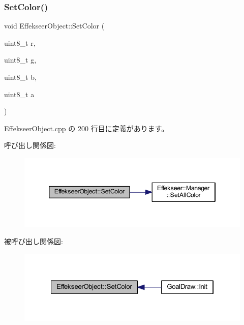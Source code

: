 \subsubsection{\texorpdfstring{Set\+Color()}{SetColor()}}
{\footnotesize\ttfamily void Effekseer\+Object\+::\+Set\+Color (\begin{DoxyParamCaption}\item[{uint8\+\_\+t}]{r,  }\item[{uint8\+\_\+t}]{g,  }\item[{uint8\+\_\+t}]{b,  }\item[{uint8\+\_\+t}]{a }\end{DoxyParamCaption})}



 Effekseer\+Object.\+cpp の 200 行目に定義があります。

呼び出し関係図\+:\nopagebreak
\begin{figure}[H]
\begin{center}
\leavevmode
\includegraphics[width=346pt]{class_effekseer_object_a5c496e56785ef7b784b13642d59d4e7f_cgraph}
\end{center}
\end{figure}
被呼び出し関係図\+:\nopagebreak
\begin{figure}[H]
\begin{center}
\leavevmode
\includegraphics[width=322pt]{class_effekseer_object_a5c496e56785ef7b784b13642d59d4e7f_icgraph}
\end{center}
\end{figure}
\mbox{\label{class_effekseer_object_aeec933c68ceb4bafc69d65590c470d72}} 

